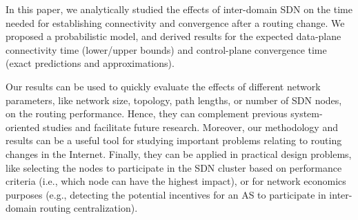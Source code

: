 In this paper, we analytically studied the effects of inter-domain SDN on the time needed for establishing connectivity and convergence after a routing change. We proposed a probabilistic model, and derived results for the expected data-plane connectivity time (lower/upper bounds) and control-plane convergence time (exact predictions and approximations).

Our results can be used to quickly evaluate the effects of different network parameters, like network size, topology, path lengths, or number of SDN nodes, on the routing performance. Hence, they can complement previous system-oriented studies and facilitate future research. Moreover, our methodology and results can be a useful tool for studying important problems relating to routing changes in the Internet. Finally, they can be applied in practical design problems, like selecting the nodes to participate in the SDN cluster based on performance criteria (i.e., which node can have the highest impact), or for network economics purposes (e.g., detecting the potential incentives for an AS to participate in inter-domain routing centralization).

%
%
%
